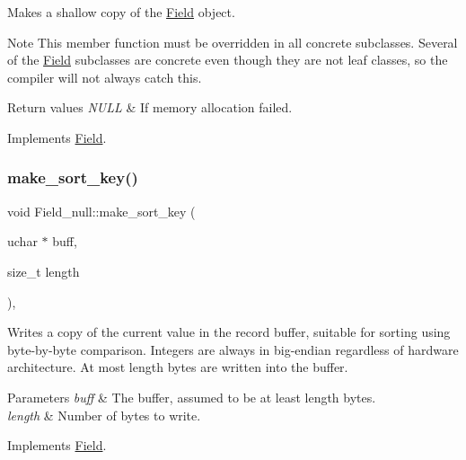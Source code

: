 Makes a shallow copy of the \mbox{\hyperlink{classField}{Field}} object.

\begin{DoxyNote}{Note}
This member function must be overridden in all concrete subclasses. Several of the \mbox{\hyperlink{classField}{Field}} subclasses are concrete even though they are not leaf classes, so the compiler will not always catch this.
\end{DoxyNote}

\begin{DoxyRetVals}{Return values}
{\em N\+U\+LL} & If memory allocation failed. \\
\hline
\end{DoxyRetVals}


Implements \mbox{\hyperlink{classField_a01a9a9aa3a618941e839b1b8793c969d}{Field}}.

\mbox{\label{classField__null_a0884e171c5d4b91b3caca8c183623668}} 
\subsubsection{\texorpdfstring{make\+\_\+sort\+\_\+key()}{make\_sort\_key()}}
{\footnotesize\ttfamily void Field\+\_\+null\+::make\+\_\+sort\+\_\+key (\begin{DoxyParamCaption}\item[{uchar $\ast$}]{buff,  }\item[{size\+\_\+t}]{length }\end{DoxyParamCaption})\hspace{0.3cm}{\ttfamily [inline]}, {\ttfamily [virtual]}}

Writes a copy of the current value in the record buffer, suitable for sorting using byte-\/by-\/byte comparison. Integers are always in big-\/endian regardless of hardware architecture. At most length bytes are written into the buffer.


\begin{DoxyParams}{Parameters}
{\em buff} & The buffer, assumed to be at least length bytes.\\
\hline
{\em length} & Number of bytes to write. \\
\hline
\end{DoxyParams}


Implements \mbox{\hyperlink{classField_af3bc27d237b6ae6ef3dc7a2aec3d79ac}{Field}}.

